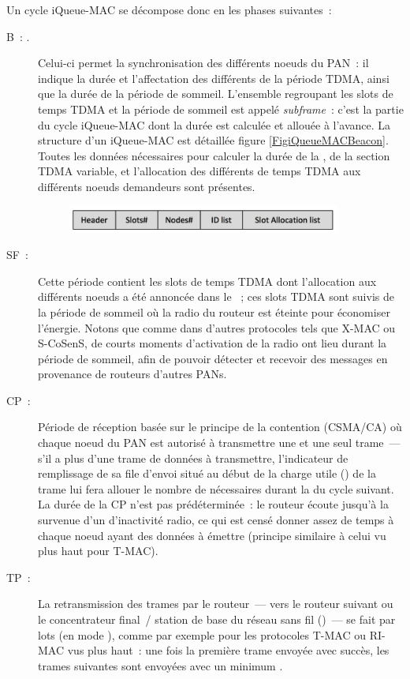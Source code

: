 Un cycle iQueue-MAC se décompose donc en les phases suivantes~:
\begin{description}
\item[B~: .]
Celui-ci permet la synchronisation des différents noeuds du PAN~:
il indique la durée et l'affectation des différents  de la
période TDMA, ainsi que la durée de la période de sommeil. L'ensemble
regroupant les slots de temps TDMA et la période de sommeil est appelé
\emph{subframe}~: c'est la partie du cycle iQueue-MAC dont la durée est
calculée et allouée à l'avance. La structure d'un 
iQueue-MAC est détaillée figure \vref{FigiQueueMACBeacon}.
Toutes les données nécessaires pour calculer la durée de la
, de la section TDMA variable, et l'allocation
des différents  de temps TDMA aux différents noeuds
demandeurs sont présentes.

\begin{figure}[!bpt]
\centering
\includegraphics[width=9cm]{images/ch3-iqueue-mac-beacon.png}
\label{FigiQueueMACBeacon}
\end{figure}

\item[SF~: ]
Cette période contient les slots de temps TDMA dont l'allocation aux
différents noeuds a été annoncée dans le ~; ces slots TDMA
sont suivis de la période de sommeil où la radio du routeur est éteinte
pour économiser l'énergie. Notons que comme dans d'autres protocoles tels
que X-MAC ou S-CoSenS, de courts moments d'activation de la radio ont lieu
durant la période de sommeil, afin de pouvoir détecter et recevoir des
messages en provenance de routeurs d'autres PANs.
\item[CP~: ]
Période de réception basée sur le principe de la contention (CSMA/CA) où
chaque noeud du PAN est autorisé à transmettre une et une seul trame~---
s'il a plus d'une trame de données à transmettre, l'indicateur de
remplissage de sa file d'envoi situé au début de la charge utile
() de la trame lui fera allouer le nombre de 
nécessaires durant la  du cycle suivant. La durée de la CP
n'est pas prédéterminée~: le routeur écoute jusqu'à la survenue d'un
 d'inactivité radio, ce qui est censé donner assez de temps
à chaque noeud ayant des données à émettre (principe similaire à celui
vu plus haut pour T-MAC).
\item[TP~: ]
La retransmission des trames par le routeur~--- vers le routeur suivant
ou le concentrateur final~/ station de base du réseau sans fil
()~--- se fait par lots (en mode ),
comme par exemple pour les protocoles T-MAC ou RI-MAC vus plus haut~:
une fois la première trame envoyée avec succès, les trames suivantes
sont envoyées avec un minimum .
\end{description}


